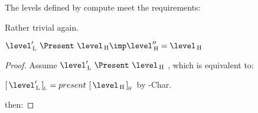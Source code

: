 
The levels defined by compute meet the requirements:


Rather trivial again.




\pagebreak
$\level'\L~\Present~\level\H \imp \level''\H = \level\H $


\begin{proof} Assume $\level'\L~\Present~\level\H$ , which is equivalent to:

$\eqcl{\level'\L}{L} = present~\eqcl{\level\H}{H}$  by  {\sc \present-Char}.

then:

\end{proof}


%
%
%


